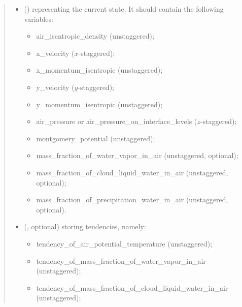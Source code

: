 \documentclass[letterpaper,10pt,english]{sphinxmanual}
\begin{document}
\begin{fulllineitems}
\begin{fulllineitems}
\begin{quote}
\begin{description}
\begin{itemize}
\item {} 
 () \textendash{} 
{\hyperref[\detokenize{api:storages.state_isentropic.StateIsentropic}]{}} representing the current state.
It should contain the following variables:
\begin{itemize}
\item {} 
air\_isentropic\_density (unstaggered);

\item {} 
x\_velocity (\(x\)-staggered);

\item {} 
x\_momentum\_isentropic (unstaggered);

\item {} 
y\_velocity (\(y\)-staggered);

\item {} 
y\_momentum\_isentropic (unstaggered);

\item {} 
air\_pressure or air\_pressure\_on\_interface\_levels (\(z\)-staggered);

\item {} 
montgomery\_potential (unstaggered);

\item {} 
mass\_fraction\_of\_water\_vapor\_in\_air (unstaggered, optional);

\item {} 
mass\_fraction\_of\_cloud\_liquid\_water\_in\_air (unstaggered, optional);

\item {} 
mass\_fraction\_of\_precipitation\_water\_in\_air (unstaggered, optional).

\end{itemize}


\item {} 
 (, optional) \textendash{} 
{\hyperref[\detokenize{api:storages.grid_data.GridData}]{}} storing tendencies, namely:
\begin{itemize}
\item {} 
tendency\_of\_air\_potential\_temperature (unstaggered);

\item {} 
tendency\_of\_mass\_fraction\_of\_water\_vapor\_in\_air (unstaggered);

\item {} 
tendency\_of\_mass\_fraction\_of\_cloud\_liquid\_water\_in\_air (unstaggered);


\end{itemize}
\end{itemize}
\end{description}
\end{quote}
\end{fulllineitems}
\end{fulllineitems}
\end{document}
